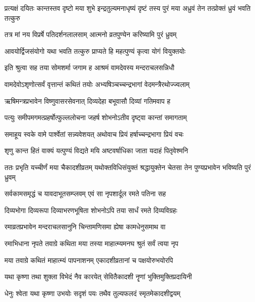 
\threelineshloka
{प्रत्यक्षं दयितः कान्तस्तव दृष्टो मया शुभे}
{इन्द्रतुल्यमनाधृष्यं दृष्टं तस्य पुरं मया}
{अध्रुवं तेन तत्प्रोक्तं ध्रुवं भवति तत्कुरु}%


\twolineshloka
{तत्र मां नय विप्रर्षे पतिदर्शनलालसाम्}
{आत्मनो व्रतपुण्येन करिष्यामि पुरं ध्रुवम्}%

\twolineshloka
{आवयोर्द्विजसंयोगो यथा भवति तत्कुरु}
{प्राप्यते हि महत्पुण्यं कृत्वा योगं वियुक्तयोः}%

\twolineshloka
{इति श्रुत्वा सह तया सोमशर्मा जगाम ह}
{आश्रमं वामदेवस्य मन्दराचलसन्निधौ}%

\twolineshloka
{वामदेवोऽशृणोत्सर्वं वृत्तान्तं कथितं तयोः}
{अभ्यषिञ्चच्चन्द्रभागां वेदमन्त्रैरथोज्ज्वलाम्}%

\twolineshloka
{ऋषिमन्त्रप्रभावेन विष्णुवासरसेवनात्}
{दिव्यदेहा बभूवासौ दिव्यां गतिमवाप ह}%

\twolineshloka
{पत्युः समीपमगमत्प्रहर्षोत्फुल्ललोचना}
{जहर्ष शोभनोऽतीव दृष्ट्वा कान्तां समागताम्}%

\twolineshloka
{समाहूय स्वके वामे पार्श्वेतां सन्न्यवेशयत्}
{अथोवाच प्रियं हर्षाच्चन्द्रभागा प्रियं वचः}%

\twolineshloka
{शृणु कान्त हितं वाक्यं यत्पुण्यं विद्यते मयि}
{अष्टवर्षाधिका जाता यदाहं पितृवेश्मनि}%

\threelineshloka
{ततः प्रभृति यच्चीर्णं मया चैकादशीव्रतम्}
{यथोक्तविधिसंयुक्तं श्रद्धायुक्तेन चेतसा}
{तेन पुण्यप्रभावेन भविष्यति पुरं ध्रुवम्}%

\twolineshloka
{सर्वकामसमृद्धं च यावदाभूतसम्प्लवम्}
{एवं सा नृपशार्दूल रमते पतिना सह}%

\twolineshloka
{दिव्यभोगा दिव्यरूपा दिव्याभरणभूषिता}
{शोभनोऽपि तया सार्धं रमते दिव्यविग्रहः}%

\twolineshloka
{रमाव्रतप्रभावेन मन्दराचलसानुनि}
{चिन्तामणिसमा ह्येषा कामधेनुसमाथ वा}%

\twolineshloka
{रमाभिधाना नृपते तवाग्रे कथिता मया}
{तस्या माहात्म्यमनघ श्रुतं सर्वं त्वया नृप}%

\twolineshloka
{मया तवाग्रे कथितं माहात्म्यं पापनाशनम्}
{एकादशीव्रतानां च पक्षयोरुभयोरपि}%

\twolineshloka
{यथा कृष्णा तथा शुक्ला विभेदं नैव कारयेत्}
{सेवितैकादशी नॄणां भुक्तिमुक्तिप्रदायिनी}%

\twolineshloka
{धेनुः श्वेता यथा कृष्णा उभयोः सदृशं पयः}
{तथैव तुल्यफलदं स्मृतमेकादशीद्वयम्}%

